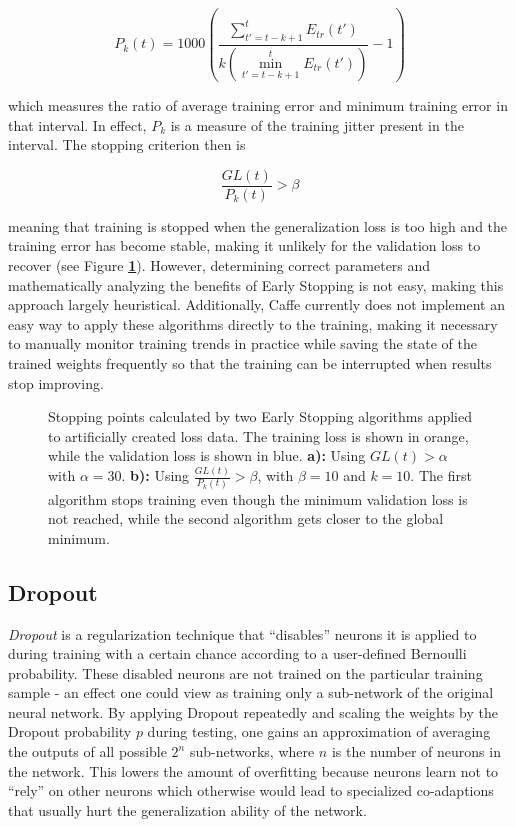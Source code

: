 \[ P_k(t) = 1000 \left ( \frac{\sum_{t' = t - k + 1}^{t} E_{tr}(t')}{k (\min_{t' = t - k + 1}^{t} E_{tr}(t'))} - 1 \right ) \]

\noindent which measures the ratio of average training error and minimum training error in that interval. In effect, $P_k$ is a measure of the training jitter present in the interval. The stopping criterion then is 

\[ \frac{GL(t)}{P_k(t)} > \beta \]

\noindent meaning that training is stopped when the generalization loss is too high and the training error has become stable, making it unlikely for the validation loss to recover (see Figure \textbf{\ref{fig:early_stopping}}). However, determining correct parameters and mathematically analyzing the benefits of Early Stopping is not easy, making this approach largely heuristical. Additionally, Caffe currently does not implement an easy way to apply these algorithms directly to the training, making it necessary to manually monitor training trends in practice while saving the state of the trained weights frequently so that the training can be interrupted when results stop improving.


\begin {figure}[!ht]
	\begin{center}
		\scalebox{0.7}{}
	\end{center}
	\caption[]{Stopping points calculated by two Early Stopping algorithms applied to artificially created loss data. The training loss is shown in orange, while the validation loss is shown in blue. \textbf{a):} Using $GL(t) > \alpha$ with $\alpha = 30$. \textbf{b):} Using $\frac{GL(t)}{P_k(t)} > \beta$, with $\beta = 10$ and $k = 10$. The first algorithm stops training even though the minimum validation loss is not reached, while the second algorithm gets closer to the global minimum. }
	\label{fig:early_stopping}
\end {figure}


	\subsection {Dropout}
\label{subsec:dropout}
\textit{Dropout} is a regularization technique \cite{dropout} that ``disables'' neurons it is applied to during training with a certain chance according to a user-defined Bernoulli probability. These disabled neurons are not trained on the particular training sample - an effect one could view as training only a sub-network of the original neural network. By applying Dropout repeatedly and scaling the weights by the Dropout probability $p$ during testing, one gains an approximation of averaging the outputs of all possible $2^n$ sub-networks, where $n$ is the number of neurons in the network. This lowers the amount of overfitting because neurons learn not to ``rely'' on other neurons which otherwise would lead to specialized co-adaptions that usually hurt the generalization ability of the network.



